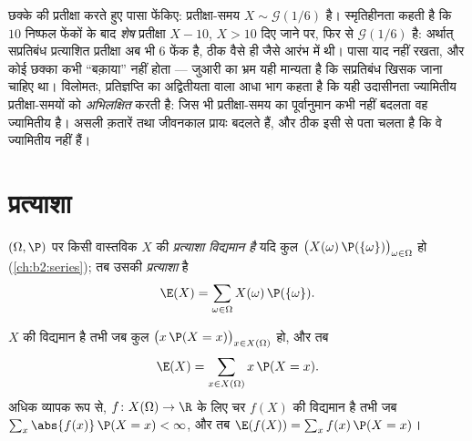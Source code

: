 \begin{example}[कोई संख्या कभी ``बक़ाया'' नहीं होती]
छक्के की प्रतीक्षा करते हुए पासा फेंकिए: प्रतीक्षा-समय $X \sim
\mathcal G(1/6)$ है।
स्मृतिहीनता कहती है कि $10$ निष्फल फेंकों के बाद \emph{शेष}
प्रतीक्षा $X - 10$, $X > 10$ दिए जाने पर, फिर से $\mathcal G(1/6)$ है: अर्थात् सप्रतिबंध
प्रत्याशित प्रतीक्षा अब भी $6$ फेंक है, ठीक वैसे ही जैसे आरंभ में
थी। पासा याद नहीं रखता, और कोई छक्का कभी ``बक़ाया'' नहीं होता ---
जुआरी का भ्रम यही मान्यता है कि सप्रतिबंध  खिसक जाना चाहिए था।
विलोमतः, प्रतिज्ञप्ति का अद्वितीयता वाला आधा भाग कहता है कि यही
उदासीनता ज्यामितीय प्रतीक्षा-समयों को \emph{अभिलक्षित} करती है:
जिस भी प्रतीक्षा-समय का पूर्वानुमान कभी नहीं बदलता वह ज्यामितीय
है। असली क़तारें तथा जीवनकाल प्रायः बदलते हैं, और ठीक इसी से पता
चलता है कि वे ज्यामितीय नहीं हैं।
\end{example}

\section{प्रत्याशा}

\begin{definition}[प्रत्याशा]\label{def:b2:randomvar:expectation}
$(\Omega, \P)$ पर किसी वास्तविक  $X$ की \emph{प्रत्याशा विद्यमान
है} यदि कुल $\bigl(X(\omega)\,\P(\{\omega\})\bigr)_{\omega \in \Omega}$  हो (\cref{ch:b2:series}); तब उसकी
\emph{प्रत्याशा} है
\[
\E(X) = \sum_{\omega \in \Omega} X(\omega)\,\P(\{\omega\}) .
\]
\end{definition}

\begin{theorem}[अंतरण प्रमेय]\label{thm:b2:randomvar:transfer}
$X$ की  विद्यमान है तभी जब कुल $\bigl(x\,\P(X =
x)\bigr)_{x \in X(\Omega)}$  हो, और तब
\[
\E(X) = \sum_{x \in X(\Omega)} x\,\P(X = x) .
\]
अधिक व्यापक रूप से, $f \colon X(\Omega) \to \R$ के लिए चर $f(X)$ की  विद्यमान है तभी
जब $\sum_x \abs{f(x)}\,\P(X = x) <
\infty$, और तब $\E(f(X)) = \sum_x f(x)\,\P(X = x)$।
\end{theorem}

